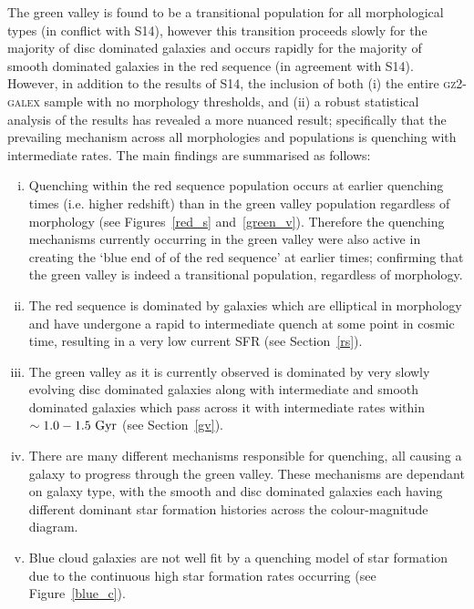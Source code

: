 The green valley is found to be a transitional population for all morphological types (in conflict with S14), however this transition proceeds slowly for the majority of disc dominated galaxies and occurs rapidly for the majority of smooth dominated galaxies in the red sequence (in agreement with S14). However, in addition to the results of S14, the inclusion of both (i) the entire \textsc{gz2-galex} sample with no morphology thresholds, and (ii) a robust statistical analysis of the results has revealed a more nuanced result; specifically that the prevailing mechanism across all morphologies and populations is quenching with intermediate rates. The main findings are summarised as follows:
\begin{enumerate}[(i)]
\item Quenching within the red sequence population occurs at earlier quenching times (i.e. higher redshift) than in the green valley population regardless of morphology (see Figures~\ref{red_s} and~\ref{green_v}). Therefore the quenching mechanisms currently occurring in the green valley were also active in creating the `blue end of of the red sequence' at earlier times; confirming that the green valley is indeed a transitional population, regardless of morphology.

\item The red sequence is dominated by galaxies which are elliptical in morphology and have undergone a rapid to intermediate quench at some point in cosmic time, resulting in a very low current SFR (see Section~\ref{rs}).

\item The green valley as it is currently observed is dominated by very slowly evolving disc dominated galaxies along with intermediate and smooth dominated galaxies which pass across it with intermediate rates within $\sim 1.0-1.5~\rm{Gyr}$ (see Section~\ref{gv}).

\item There are many different mechanisms responsible for quenching, all causing a galaxy to progress through the green valley. These mechanisms are dependant on galaxy type, with the smooth and disc dominated galaxies each having different dominant star formation histories across the colour-magnitude diagram. 

\item Blue cloud galaxies are not well fit by a quenching model of star formation due to the continuous high star formation rates occurring (see Figure~\ref{blue_c}).


\end{enumerate}

